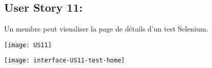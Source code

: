 \newpage{}
\subsection{User Story 11:}
Un membre peut visualiser la page de détails d'un test Selenium.

  \begin{center}
        \texttt{[image: US11]}
  \end{center}

  \newpage{}
  \begin{center}
        \texttt{[image: interface-US11-test-home]}
  \end{center}